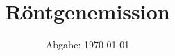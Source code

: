 

\subject{Versuchsnummer: 602}
\title{Röntgenemission}
\date{
  Abgabe: \today
}



\maketitle
\thispagestyle{empty}
\tableofcontents
\newpage




\newpage
\nocite{*}
\printbibliography


